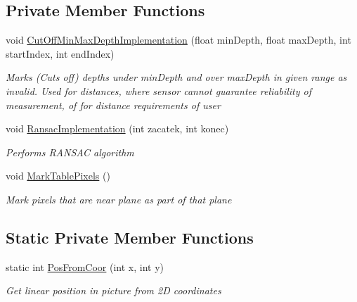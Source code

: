 \subsection*{Private Member Functions}
\begin{DoxyCompactItemize}
\item 
void \mbox{\hyperlink{class_chess_tracking_1_1_image_processing_1_1_plane_algorithms_1_1_data_ae981498fae36fb12b15958e553cbb180}{Cut\+Off\+Min\+Max\+Depth\+Implementation}} (float min\+Depth, float max\+Depth, int start\+Index, int end\+Index)
\begin{DoxyCompactList}\small\item\em Marks (Cuts off) depths under min\+Depth and over max\+Depth in given range as invalid. Used for distances, where sensor cannot guarantee reliability of measurement, of for distance requirements of user \end{DoxyCompactList}\item 
void \mbox{\hyperlink{class_chess_tracking_1_1_image_processing_1_1_plane_algorithms_1_1_data_ad5065038051954ae954b3ecd310e8c9b}{Ransac\+Implementation}} (int zacatek, int konec)
\begin{DoxyCompactList}\small\item\em Performs R\+A\+N\+S\+AC algorithm \end{DoxyCompactList}\item 
void \mbox{\hyperlink{class_chess_tracking_1_1_image_processing_1_1_plane_algorithms_1_1_data_a5ad7ead3acd0dc6b41fb632c3d3b2a8a}{Mark\+Table\+Pixels}} ()
\begin{DoxyCompactList}\small\item\em Mark pixels that are near plane as part of that plane \end{DoxyCompactList}\end{DoxyCompactItemize}
\subsection*{Static Private Member Functions}
\begin{DoxyCompactItemize}
\item 
static int \mbox{\hyperlink{class_chess_tracking_1_1_image_processing_1_1_plane_algorithms_1_1_data_a30fbf7f86b4a8885d6034ba17fa23f7b}{Pos\+From\+Coor}} (int x, int y)
\begin{DoxyCompactList}\small\item\em Get linear position in picture from 2D coordinates \end{DoxyCompactList}\end{DoxyCompactItemize}


